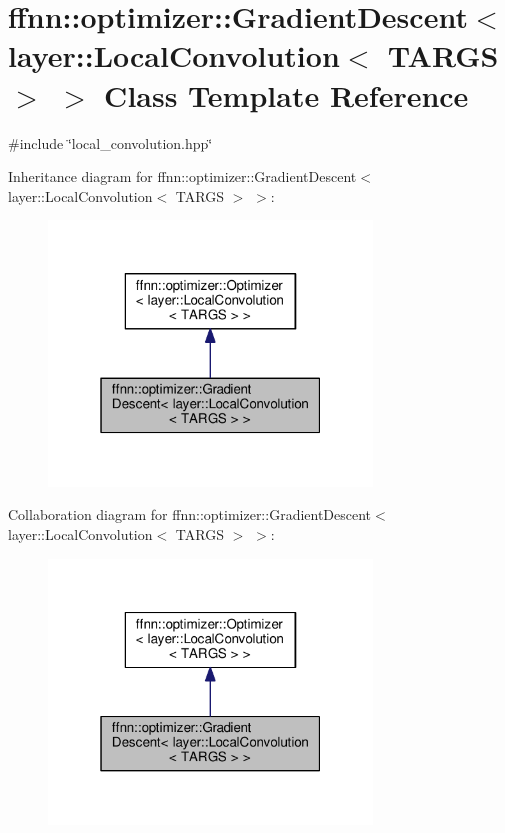 \hypertarget{classffnn_1_1optimizer_1_1_gradient_descent_3_01layer_1_1_local_convolution_3_01_t_a_r_g_s_01_4_01_4}{\section{ffnn\-:\-:optimizer\-:\-:Gradient\-Descent$<$ layer\-:\-:Local\-Convolution$<$ T\-A\-R\-G\-S $>$ $>$ Class Template Reference}
\label{classffnn_1_1optimizer_1_1_gradient_descent_3_01layer_1_1_local_convolution_3_01_t_a_r_g_s_01_4_01_4}
}


{\ttfamily \#include \char`\"{}local\-\_\-convolution.\-hpp\char`\"{}}



Inheritance diagram for ffnn\-:\-:optimizer\-:\-:Gradient\-Descent$<$ layer\-:\-:Local\-Convolution$<$ T\-A\-R\-G\-S $>$ $>$\-:\nopagebreak
\begin{figure}[H]
\begin{center}
\leavevmode
\includegraphics[width=244pt]{classffnn_1_1optimizer_1_1_gradient_descent_3_01layer_1_1_local_convolution_3_01_t_a_r_g_s_01_4_01_4__inherit__graph}
\end{center}
\end{figure}


Collaboration diagram for ffnn\-:\-:optimizer\-:\-:Gradient\-Descent$<$ layer\-:\-:Local\-Convolution$<$ T\-A\-R\-G\-S $>$ $>$\-:\nopagebreak
\begin{figure}[H]
\begin{center}
\leavevmode
\includegraphics[width=244pt]{classffnn_1_1optimizer_1_1_gradient_descent_3_01layer_1_1_local_convolution_3_01_t_a_r_g_s_01_4_01_4__coll__graph}
\end{center}
\end{figure}

